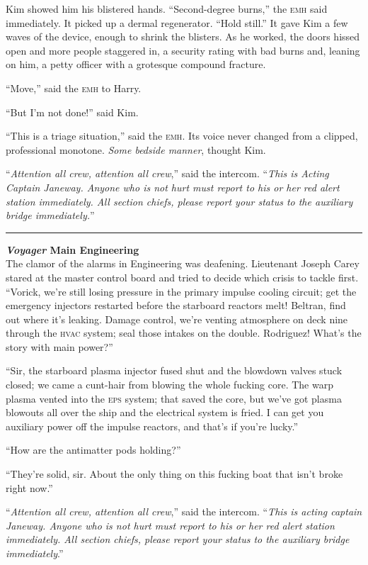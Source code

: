 \documentclass[twoside,letterpaper,12pt]{memoir}
\begin{document}
Kim showed him his blistered hands. ``Second-degree burns,'' the \textsc{emh} said immediately. It picked up a dermal regenerator. ``Hold still.'' It gave Kim a few waves of the device, enough to shrink the blisters. As he worked, the doors hissed open and more people staggered in, a security rating with bad burns and, leaning on him, a petty officer with a grotesque compound fracture.

``Move,'' said the \textsc{emh} to Harry.

``But I'm not done!'' said Kim.

``This is a triage situation,'' said the \textsc{emh}. Its voice never changed from a clipped, professional monotone. \textit{Some bedside manner}, thought Kim.

``\textit{Attention all crew, attention all crew},'' said the intercom. ``\textit{This is Acting Captain Janeway. Anyone who is not hurt must report to his or her red alert station immediately. All section chiefs, please report your status to the auxiliary bridge immediately.}''

\fancybreak{\rule{3cm}{0.4 pt}}
\noindent\textbf{\textit{Voyager} Main Engineering}\\

The clamor of the alarms in Engineering was deafening. Lieutenant Joseph Carey stared at the master control board and tried to decide which crisis to tackle first. ``Vorick, we're still losing pressure in the primary impulse cooling circuit; get the emergency injectors restarted before the starboard reactors melt! Beltran, find out where it's leaking. Damage control, we're venting atmosphere on deck nine through the \textsc{hvac} system; seal those intakes on the double. Rodriguez! What's the story with main power?''

``Sir, the starboard plasma injector fused shut and the blowdown valves stuck closed; we came a cunt-hair from blowing the whole fucking core. The warp plasma vented into the \textsc{eps} system; that saved the core, but we've got plasma blowouts all over the ship and the electrical system is fried. I can get you auxiliary power off the impulse reactors, and that's if you're lucky.''

``How are the antimatter pods holding?''

``They're solid, sir. About the only thing on this fucking boat that isn't broke right now.''

``\textit{Attention all crew, attention all crew},'' said the intercom. ``\textit{This is acting captain Janeway. Anyone who is not hurt must report to his or her red alert station immediately. All section chiefs, please report your status to the auxiliary bridge immediately}.''
\end{document}
